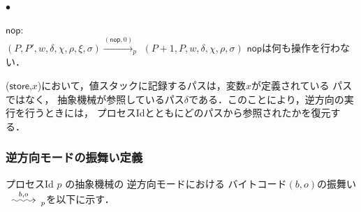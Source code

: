 \documentclass[submit,PRO]{ipsj}
\makeatletter
\newcommand{\longsquiggly}{\xymatrix{{}\ar@{~>}[r]&{}}}
\newcommand{\bcode}[1]{$\mathsf{#1}$}
\newcommand{\brightarrow}[1]{\stackrel{#1}{\longsquiggly}}
\makeatother
\begin{document}
\begin{list}{$\bullet$}{}
\item \bcode{nop}:\\
$(P,P',w,\delta,\chi,\rho,\xi,\sigma)\xrightarrow{(\mathsf{nop},0)}_p$\newline
\qquad $(P+1,P,w,\delta,\chi,\rho,\sigma)$\newline
\bcode{nop}は何も操作を行わない．
\end{list}

(\bcode{store},$x$)において，値スタックに記録するパスは，変数$x$が定義されている
パスではなく，
抽象機械が参照しているパス$\delta$である．このことにより，逆方向の実行を行うときには，
プロセスIdとともにどのパスから参照されたかを復元する．

\subsubsection{逆方向モードの振舞い定義}

プロセスId $p$ の抽象機械の
逆方向モードにおける%
バイトコード$(b,o)$の振舞い
$\brightarrow{b,o}_{p}$を以下に示す．
\end{document}
